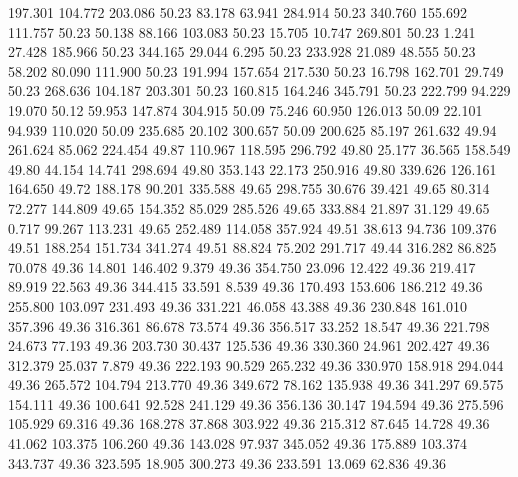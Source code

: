  197.301  104.772  203.086        50.23
  83.178   63.941  284.914        50.23
 340.760  155.692  111.757        50.23
  50.138   88.166  103.083        50.23
  15.705   10.747  269.801        50.23
   1.241   27.428  185.966        50.23
 344.165   29.044    6.295        50.23
 233.928   21.089   48.555        50.23
  58.202   80.090  111.900        50.23
 191.994  157.654  217.530        50.23
  16.798  162.701   29.749        50.23
 268.636  104.187  203.301        50.23
 160.815  164.246  345.791        50.23
 222.799   94.229   19.070        50.12
  59.953  147.874  304.915        50.09
  75.246   60.950  126.013        50.09
  22.101   94.939  110.020        50.09
 235.685   20.102  300.657        50.09
 200.625   85.197  261.632        49.94
 261.624   85.062  224.454        49.87
 110.967  118.595  296.792        49.80
  25.177   36.565  158.549        49.80
  44.154   14.741  298.694        49.80
 353.143   22.173  250.916        49.80
 339.626  126.161  164.650        49.72
 188.178   90.201  335.588        49.65
 298.755   30.676   39.421        49.65
  80.314   72.277  144.809        49.65
 154.352   85.029  285.526        49.65
 333.884   21.897   31.129        49.65
   0.717   99.267  113.231        49.65
 252.489  114.058  357.924        49.51
  38.613   94.736  109.376        49.51
 188.254  151.734  341.274        49.51
  88.824   75.202  291.717        49.44
 316.282   86.825   70.078        49.36
  14.801  146.402    9.379        49.36
 354.750   23.096   12.422        49.36
 219.417   89.919   22.563        49.36
 344.415   33.591    8.539        49.36
 170.493  153.606  186.212        49.36
 255.800  103.097  231.493        49.36
 331.221   46.058   43.388        49.36
 230.848  161.010  357.396        49.36
 316.361   86.678   73.574        49.36
 356.517   33.252   18.547        49.36
 221.798   24.673   77.193        49.36
 203.730   30.437  125.536        49.36
 330.360   24.961  202.427        49.36
 312.379   25.037    7.879        49.36
 222.193   90.529  265.232        49.36
 330.970  158.918  294.044        49.36
 265.572  104.794  213.770        49.36
 349.672   78.162  135.938        49.36
 341.297   69.575  154.111        49.36
 100.641   92.528  241.129        49.36
 356.136   30.147  194.594        49.36
 275.596  105.929   69.316        49.36
 168.278   37.868  303.922        49.36
 215.312   87.645   14.728        49.36
  41.062  103.375  106.260        49.36
 143.028   97.937  345.052        49.36
 175.889  103.374  343.737        49.36
 323.595   18.905  300.273        49.36
 233.591   13.069   62.836        49.36
